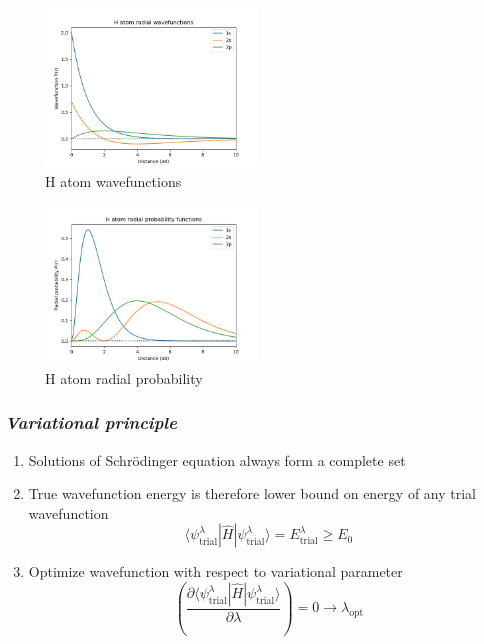 \documentclass[11pt]{article}
\begin{document}
\begin{figure}[htbp]
\centering
\includegraphics[width=0.5\textwidth]{./Images/H-R.png}
\caption{H atom wavefunctions}
\end{figure} 
\begin{figure}[htbp]
\centering
\includegraphics[width=0.5\textwidth]{./Images/H-P.png}
\caption{H atom radial probability}
\end{figure} 
\subsubsection{\emph{Variational principle}}
\label{sec:org4db7168}
\begin{enumerate}
\item Solutions of Schr\"{o}dinger equation always form a complete set
\item True wavefunction energy is therefore lower bound on energy of any trial wavefunction
\[\langle \psi_\text{trial}^\lambda | \hat{H} | \psi_\text{trial}^\lambda\rangle =E_\text{trial}^\lambda \geq E_0\]
\item Optimize wavefunction with respect to variational parameter
\[ \left ( \frac{\partial \langle \psi_\text{trial}^\lambda | \hat{H} | \psi_\text{trial}^\lambda\rangle}{\partial\lambda} \right ) = 0 \rightarrow \lambda_\text{opt} \]
\end{enumerate}
\end{document}
